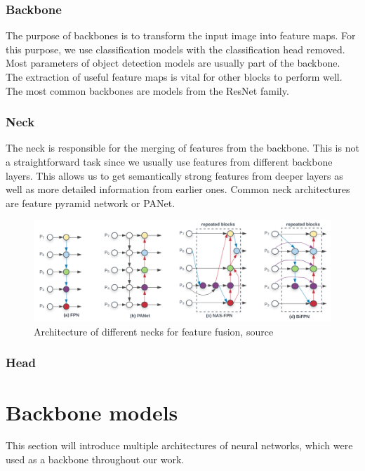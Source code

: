 \subsubsection{Backbone}
The purpose of backbones is to transform the input image into feature maps. For this purpose, we use classification models with the classification head removed. Most parameters of object detection models are usually part of the backbone. The extraction of useful feature maps is vital for other blocks to perform well. The most common backbones are models from the ResNet family.

\subsubsection{Neck}
The neck is responsible for the merging of features from the backbone. This is not a straightforward task since we usually use features from different backbone layers. This allows us to get semantically strong features from deeper layers as well as more detailed information from earlier ones. Common neck architectures are feature pyramid network or PANet.
\begin{figure}
    \centering
    \includegraphics[width=\linewidth]{images/necks_architecture.png}
    \caption{Architecture of different necks for feature fusion, source \cite{Tan2019}}
    \label{fig:necks}
\end{figure}

\subsubsection{Head}

\section{Backbone models}
This section will introduce multiple architectures of neural networks, which were used as a backbone throughout our work.
